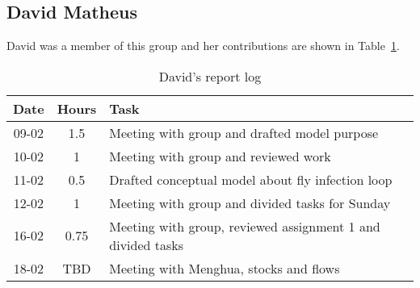 \subsection{David Matheus}
David was a member of this group and her contributions are shown in Table~\ref{tab:david_log}. 
\begin{longtable}[c]{c|c|m{35em}}
\caption{David's report log}
\label{tab:david_log}\\
\textbf{Date}& \textbf{Hours} & \textbf{Task} \\
\hline
\endfirsthead
%
\endhead
%
09-02   &   1.5     &   Meeting with group and drafted model purpose                    \\
10-02   &   1       &   Meeting with group and reviewed work                            \\
11-02   &   0.5     &   Drafted conceptual model about fly infection loop               \\
12-02   &   1       &   Meeting with group and divided tasks for Sunday                 \\
16-02   &   0.75    &   Meeting with group, reviewed assignment 1 and divided tasks     \\
18-02   &   TBD     &   Meeting with Menghua, stocks and flows                          \\
\end{longtable}